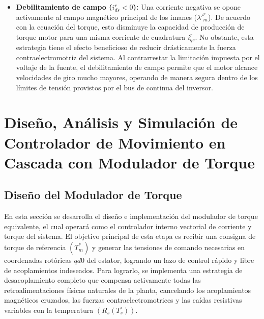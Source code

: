 \documentclass[12pt, a4paper,journal, onecolumn, compsoc]{IEEEtran}
\begin{document}
\begin{itemize}
\begin{itemize}
    \item \textbf{Debilitamiento de campo ($i_{ds}^r < 0$):} Una corriente negativa se opone activamente al campo magnético principal de los imanes ($\lambda'^r_m$). De acuerdo con la ecuación del torque, esto disminuye la capacidad de producción de torque motor para una misma corriente de cuadratura $i_{qs}^r$. No obstante, esta estrategia tiene el efecto beneficioso de reducir drásticamente la fuerza contraelectromotriz del sistema. Al contrarrestar la limitación impuesta por el voltaje de la fuente, el debilitamiento de campo permite que el motor alcance velocidades de giro mucho mayores, operando de manera segura dentro de los límites de tensión provistos por el bus de continua del inversor.
\end{itemize}
\end{itemize}



\section{Diseño, Análisis y Simulación de Controlador de Movimiento en Cascada con Modulador de Torque}
\subsection{Diseño del Modulador de Torque}

En esta sección se desarrolla el diseño e implementación del modulador de torque equivalente, el cual operará como el controlador interno vectorial de corriente y torque del sistema. El objetivo principal de esta etapa es recibir una consigna de torque de referencia $(T_m^*)$ y generar las tensiones de comando necesarias en coordenadas rotóricas \(qd0\) del estator, logrando un lazo de control rápido y libre de acoplamientos indeseados. Para lograrlo, se implementa una estrategia de desacoplamiento completo que compensa activamente todas las retroalimentaciones físicas naturales de la planta, cancelando los acoplamientos magnéticos cruzados, las fuerzas contraelectromotrices y las caídas resistivas variables con la temperatura $(R_s(T_s^\circ))$.
\end{document}
